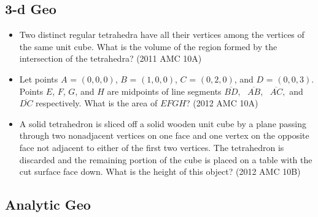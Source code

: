 \documentclass{article}
\begin{document}
\subsection{3-d Geo}

\begin{itemize}

\item Two distinct regular tetrahedra have all their vertices among the vertices of the same unit cube.  What is the volume of the region formed by the intersection of the tetrahedra? (2011 AMC 10A)

\item Let points $A$ = $(0 ,0 ,0)$, $B$ = $(1, 0, 0)$, $C$ = $(0, 2, 0)$, and $D$ = $(0, 0, 3)$. Points $E$, $F$, $G$, and $H$ are midpoints of line segments $\overline{BD},\text{ }  \overline{AB}, \text{ } \overline {AC},$ and $\overline{DC}$ respectively. What is the area of $EFGH$? (2012 AMC 10A)

\item A solid tetrahedron is sliced off a solid wooden unit cube by a plane passing through two nonadjacent vertices on one face and one vertex on the opposite face not adjacent to either of the first two vertices. The tetrahedron is discarded and the remaining portion of the cube is placed on a table with the cut surface face down. What is the height of this object? (2012 AMC 10B)



\end{itemize}


\subsection{Analytic Geo}
\end{document}
